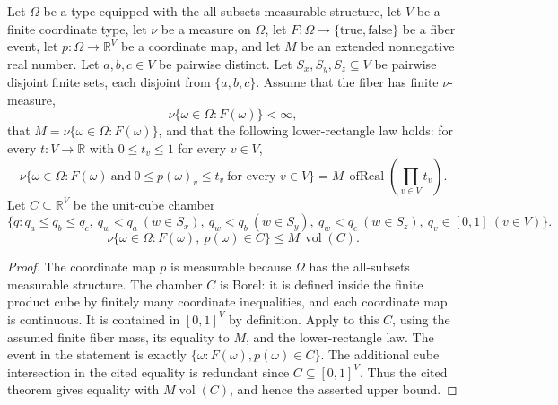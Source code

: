 \begin{helper}
Let \(\Omega\) be a type equipped with the all-subsets measurable structure,
let \(V\) be a finite coordinate type, let \(\nu\) be a measure on
\(\Omega\), let \(F:\Omega\to\{\mathrm{true},\mathrm{false}\}\) be a fiber
event, let \(p:\Omega\to\mathbb R^V\) be a coordinate map, and let \(M\) be
an extended nonnegative real number.  Let \(a,b,c\in V\) be pairwise
distinct.  Let \(S_x,S_y,S_z\subseteq V\) be pairwise disjoint finite sets,
each disjoint from \(\{a,b,c\}\).  Assume that the fiber has finite
\(\nu\)-measure,
\[
\nu\{\omega\in\Omega:F(\omega)\}<\infty,
\]
that \(M=\nu\{\omega\in\Omega:F(\omega)\}\), and that the following
lower-rectangle law holds: for every \(t:V\to\mathbb R\) with
\(0\le t_v\le 1\) for every \(v\in V\),
\[
\nu\{\omega\in\Omega:
F(\omega)\ \text{and}\ 0\le p(\omega)_v\le t_v\ \text{for every }v\in V\}
=M\,\operatorname{ofReal}\!\left(\prod_{v\in V} t_v\right).
\]
Let \(C\subseteq\mathbb R^V\) be the unit-cube chamber
\[
\{q:q_a\le q_b\le q_c,\ q_w<q_a\ (w\in S_x),\
q_w<q_b\ (w\in S_y),\ q_w<q_c\ (w\in S_z),\ q_v\in[0,1]\ (v\in V)\}.
\]
\[
\nu\{\omega\in\Omega:F(\omega),\ p(\omega)\in C\}
\le M\,\operatorname{vol}(C).
\]
\end{helper}
\begin{proof}
The coordinate map \(p\) is measurable because \(\Omega\) has the
all-subsets measurable structure.
The chamber \(C\) is Borel: it is defined inside the finite product cube by
finitely many coordinate inequalities, and each coordinate map is continuous.
It is contained in \([0,1]^V\) by definition.  Apply
 to this
\(C\), using the assumed finite fiber mass, its equality to \(M\), and
the lower-rectangle law.
The event in the statement is exactly \(\{\omega:F(\omega),p(\omega)\in C\}\).
The additional cube intersection in the cited equality is redundant since
\(C\subseteq[0,1]^V\).  Thus the cited theorem gives equality with
\(M\operatorname{vol}(C)\), and hence the asserted upper bound.
\end{proof}
